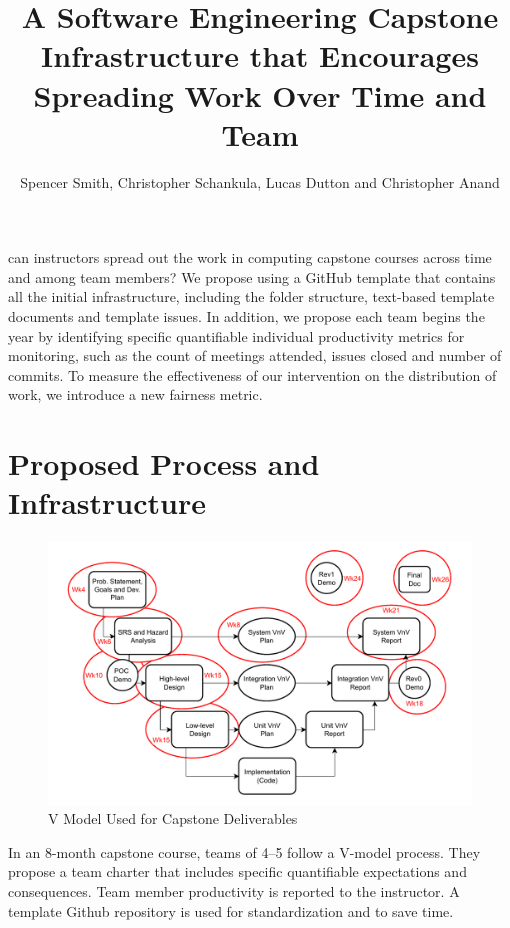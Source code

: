 \documentclass[poster, a0, plainboxedsections]{sciposter}
\title{A Software Engineering Capstone Infrastructure that Encourages Spreading
Work Over Time and Team}
\author{Spencer Smith, Christopher Schankula, Lucas Dutton and Christopher Anand}
\institute{Computing and Software Department, McMaster University}
\begin{document}

\maketitle

\setlength{\columnseprule}{0pt}
\begin{multicols}{2}

 can instructors spread out the work in computing capstone
courses across time and among team members? We propose using a GitHub template
that contains all the initial infrastructure, including the folder structure,
text-based template documents and template issues. In addition, we propose each
team begins the year by identifying specific quantifiable individual
productivity metrics for monitoring, such as the count of meetings attended,
issues closed and number of commits. To measure the effectiveness of our
intervention on the distribution of work, we introduce a new fairness metric.

\section{Proposed Process and Infrastructure} \label{SecPropInfrastruc}

\begin{figure}[!h]
\includegraphics[width=1.0\linewidth]{../figures/CourseStructure.drawio.pdf}
\caption{\label{Fig_VModel} V Model Used for Capstone Deliverables}
\label{FigStructure}
\end{figure}

In an 8-month capstone course, teams of 4--5 follow a V-model process. They
propose a team charter that includes specific quantifiable expectations and
consequences. Team member productivity is reported to the instructor. A template
Github repository is used for standardization and to save time.  


\end{multicols}
\end{document}
